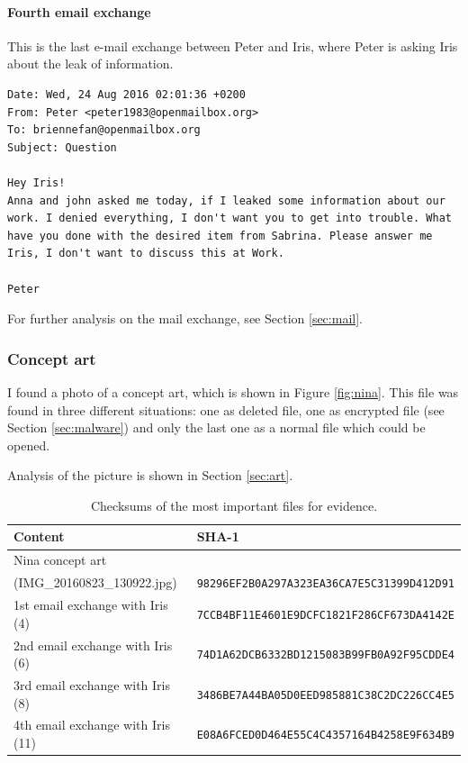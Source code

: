 \documentclass[12pt]{article}
\begin{document}
\paragraph{Fourth email exchange}
This is the last e-mail exchange between Peter and Iris, where Peter is asking Iris about the leak of information.

\begin{shaded}
\begin{verbatim}
Date: Wed, 24 Aug 2016 02:01:36 +0200
From: Peter <peter1983@openmailbox.org>
To: briennefan@openmailbox.org
Subject: Question

Hey Iris!
Anna and john asked me today, if I leaked some information about our
work. I denied everything, I don't want you to get into trouble. What
have you done with the desired item from Sabrina. Please answer me
Iris, I don't want to discuss this at Work.

Peter
\end{verbatim}
\end{shaded}
For further analysis on the mail exchange, see Section \ref{sec:mail}.

\subsubsection{Concept art}

I found a photo of a concept art, which is shown in Figure \ref{fig:nina}.
This file was found in three different situations: one as deleted file, one as encrypted file (see Section \ref{sec:malware}) and only the last one as a normal file which could be opened.

Analysis of the picture is shown in Section \ref{sec:art}.

\begin{table}[!ht]
    \centering
    \begin{tabular}{ll}
    \toprule
        \textbf{Content} & \textbf{SHA-1} \\
        \midrule
        Nina concept art \\(IMG\_20160823\_130922.jpg) & \texttt{98296EF2B0A297A323EA36CA7E5C31399D412D91} \\
        1st email exchange with Iris (4) & \texttt{7CCB4BF11E4601E9DCFC1821F286CF673DA4142E} \\
        2nd email exchange with Iris (6) & \texttt{74D1A62DCB6332BD1215083B99FB0A92F95CDDE4} \\
        3rd email exchange with Iris (8) & \texttt{3486BE7A44BA05D0EED985881C38C2DC226CC4E5} \\
        4th email exchange with Iris (11) & \texttt{E08A6FCED0D464E55C4C4357164B4258E9F634B9} \\
    \bottomrule
    \end{tabular}
    \caption{Checksums of the most important files for evidence.}
    \label{table:sha1}
\end{table}
\end{document}
